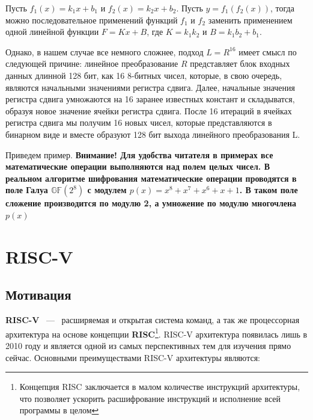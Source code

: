\documentclass[a4paper, 12pt]{article}
\begin{document}
    \begin{example}
        Пусть $f_1(x) = k_1 x + b_1$ и $f_2(x) = k_2 x + b_2$. Пусть $y = f_1(f_2(x))$,
        тогда можно последовательное применений функций $f_1$ и $f_2$ заменить 
        применением одной линейной функции $F = K x + B$, где $K = k_1 k_2$ и $B = k_1 b_2 + b_1$.
    \end{example}

    Однако, в нашем случае все немного сложнее, подход $L = R^{16}$ имеет смысл по 
    следующей причине: линейное преобразование $R$ представляет блок входных данных
    длинной 128 бит, как 16 8-битных чисел, которые, в свою очередь, являются начальными
    значениями регистра сдвига. Далее, начальные значения регистра сдвига умножаются на 
    16 заранее известных констант и складыватся, образуя новое значение ячейки регистра 
    сдвига. После 16 итераций в ячейках регистра сдвига мы получим 16 новых чисел, 
    которые представляются в бинарном виде и вместе образуют 128 бит выхода линейного
    преобразования L.

    Приведем пример. \textbf{Внимание! Для удобства читателя в примерах все математические операции выполняются над полем целых чисел. В реальном алгоритме шифрования математические операции проводятся в поле Галуа $\mathbb{GF}(2^8)$ с модулем $p(x) = x^8 + x^7 + x^6 + x + 1$. В таком поле сложение производится по модулю 2, а умножение по модулю многочлена $p(x)$}

    \begin{example}
        
    \end{example}
    
    \section{RISC-V}

    \subsection{Мотивация}

    \textbf{RISC-V} ~---~ расширяемая и открытая система команд, а так же процессорная архитектура
    на основе концепции \textbf {RISC}\footnote{Концепция RISC заключается в малом количестве инструкций
    архитектуры, что позволяет ускорить расшифрование инструкций и исполнение всей программы в целом}.
    RISC-V архитектура появилась лишь в 2010 году и является одной из самых перспективных тем для изучения
    прямо сейчас. Основными преимуществами RISC-V архитектуры являются:
\end{document}
